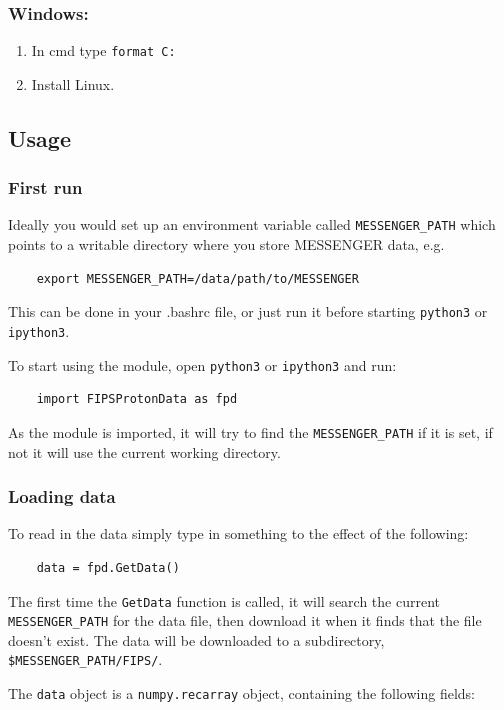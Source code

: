 	\subsubsection{Windows:}
	\begin{enumerate}
		\item In cmd type \texttt{format C:}
		\item Install Linux.
	\end{enumerate}
	
	\subsection{Usage}
	\subsubsection{First run}
	Ideally you would set up an environment variable called 
	\texttt{MESSENGER\_PATH} which points to a writable directory where you store 
	MESSENGER data, e.g. 
	\begin{verbatim}
	export MESSENGER_PATH=/data/path/to/MESSENGER
	\end{verbatim}
	This can be done in your .bashrc file, or just run it before
	starting \texttt{python3} or \texttt{ipython3}.
	
	To start using the module, open \texttt{python3} or \texttt{ipython3} and run:
	\begin{verbatim}
	import FIPSProtonData as fpd
	\end{verbatim}
	As the module is imported, it will try to find the \texttt{MESSENGER\_PATH} if 
	it is set, if not it will use the current working directory.
	
	\subsubsection{Loading data}
	To read in the data simply type in something to the effect of the 
	following:
	\begin{verbatim}
	data = fpd.GetData()
	\end{verbatim}
	The first time the \texttt{GetData} function is called, it will search the 
	current \texttt{MESSENGER\_PATH} for the data file, then download it when it 
	finds that the file doesn't exist. The data will be downloaded to a 
	subdirectory, \texttt{\$MESSENGER\_PATH/FIPS/}.
	
	The \texttt{data} object is a \texttt{numpy.recarray} object, containing the following
	fields:
	
